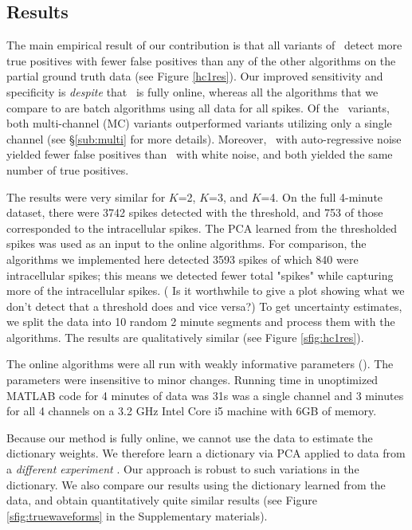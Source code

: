 \subsection{Results}

  The main empirical result of our contribution is that all variants of \smug~detect more true positives with fewer false positives
than any of the other algorithms on the partial ground truth data (see Figure \ref{hc1res}).  
Our improved sensitivity and specificity is \emph{despite} that \smug~is fully online, whereas all the algorithms that we compare to are batch algorithms using all data for all spikes.  Of the \smug~variants, both multi-channel (MC) variants outperformed variants utilizing only a single channel (see \S \ref{sub:multi} for more details).  Moreover, \smug~with auto-regressive noise yielded fewer false positives than \smug~with white noise, and both yielded the same number of true positives.  


The results were very similar for $K$=2, $K$=3, and $K$=4.   On the full 4-minute dataset, there were 3742 spikes detected with the threshold, and 753 of those corresponded to the intracellular spikes.  The PCA learned from the thresholded spikes was used as an input to the online algorithms.  For comparison, the algorithms we implemented here detected 3593 spikes of which 840 were intracellular spikes; this means we detected fewer total "spikes" while capturing more of the intracellular spikes. ({\color{red}  Is it worthwhile to give a plot showing what we don't detect that a threshold does and vice versa?})
To get uncertainty estimates, we split the data into 10 random 2 minute segments and process them with the algorithms. The results are qualitatively similar (see Figure \ref{sfig:hc1res}).


The online algorithms were all run with weakly informative parameters (). The parameters were insensitive to minor changes.  Running time in unoptimized MATLAB code for 4 minutes of data was 31s was a single channel and 3 minutes for all 4 channels on a 3.2 GHz Intel Core i5 machine with 6GB of memory.

Because our method is fully online, we cannot use the data to estimate the dictionary weights. We therefore learn a dictionary via PCA applied to data from a \emph{different experiment} .  Our approach is robust to such variations in the dictionary.  We also compare our results using the dictionary learned from the data, and obtain quantitatively quite similar results (see Figure \ref{sfig:truewaveforms} in the Supplementary materials).

